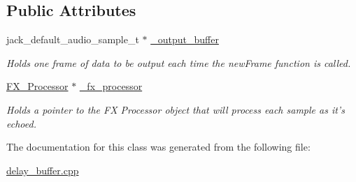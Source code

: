 \subsection*{Public Attributes}
\begin{DoxyCompactItemize}
\item 
\hypertarget{group__delay_ga82a3ce8e6e0e8e1e77add80058d5231c}{jack\+\_\+default\+\_\+audio\+\_\+sample\+\_\+t $\ast$ \hyperlink{group__delay_ga82a3ce8e6e0e8e1e77add80058d5231c}{\+\_\+output\+\_\+buffer}}\label{group__delay_ga82a3ce8e6e0e8e1e77add80058d5231c}

\begin{DoxyCompactList}\small\item\em Holds one frame of data to be output each time the {\ttfamily new\+Frame} function is called. \end{DoxyCompactList}\item 
\hypertarget{group__delay_gacaec3734e7f9717589775bc1bd9a1a08}{\hyperlink{class_f_x___processor}{F\+X\+\_\+\+Processor} $\ast$ \hyperlink{group__delay_gacaec3734e7f9717589775bc1bd9a1a08}{\+\_\+fx\+\_\+processor}}\label{group__delay_gacaec3734e7f9717589775bc1bd9a1a08}

\begin{DoxyCompactList}\small\item\em Holds a pointer to the F\+X Processor object that will process each sample as it's echoed. \end{DoxyCompactList}\end{DoxyCompactItemize}


The documentation for this class was generated from the following file\+:\begin{DoxyCompactItemize}
\item 
\hyperlink{delay__buffer_8cpp}{delay\+\_\+buffer.\+cpp}\end{DoxyCompactItemize}
